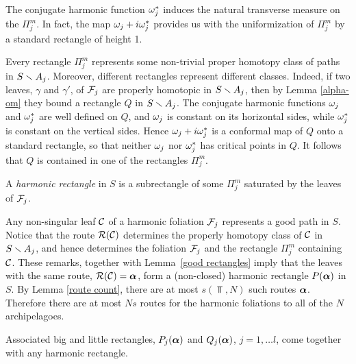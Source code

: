 The conjugate harmonic function ${\omega}_j^*$  induces the natural  transverse measure
 on the  $\Pi_j^m$. 
In fact,   %
the map $ {\omega}_j+ i {\omega}_j^*$
 provides us with the  uniformization of $\Pi^m_j$  by a standard rectangle of height 1.  

Every rectangle $\Pi_j^m$ represents some non-trivial proper homotopy class of paths in $S\smallsetminus A_j$. 
Moreover, different rectangles represent different classes.
Indeed, if two leaves, $\gamma$ and $\gamma'$, of ${\cal F}_j$ are properly homotopic in  $S\smallsetminus A_j$,
then  by Lemma \ref{alpha-om} they bound a rectangle $Q$ in $S\smallsetminus A_j$.
The conjugate  harmonic functions  ${\omega}_j$ and ${\omega}_j^*$ are well defined on $Q$,
and ${\omega}_j$ is constant on its horizontal sides, while ${\omega}_j^*$ is constant on the vertical sides. 
Hence ${\omega}_j + i{\omega}_j^*$ is a conformal map of $Q$ onto a standard rectangle,
so that neither ${\omega}_j$ nor ${\omega}_j^*$ has critical points in $Q$. 
It follows that $Q$ is contained in one of the rectangles $\Pi_j^m$.  
  

 A {\it harmonic rectangle} in $S$ is a subrectangle of some $\Pi_j^m$
saturated by the leaves of ${\cal F}_j$. 



Any non-singular leaf ${\cal C}$ of a harmonic foliation ${\cal F}_j$ represents a good path in $S$.
Notice that the route ${\cal R}({\cal C})$ determines
the properly homotopy class of ${\cal C}$ in $S\smallsetminus A_j$,
and hence determines the foliation ${\cal F}_j$ and  the  rectangle $\Pi_j^m$ containing ${\cal C}$.
These remarks, together with   Lemma~\ref{good rectangles} imply that
 the leaves with the same route,  ${\cal R}({\cal C})= {\mbox{\boldmath$\alpha$} }$, 
form  a (non-closed) harmonic rectangle  $P({\mbox{\boldmath$\alpha$} })$ in $S$.  
By Lemma \ref{route count},
there are at most $s(\Top, N)$ such routes ${\mbox{\boldmath$\alpha$} }$.
Therefore there are at most $Ns$ routes for the harmonic foliations 
 to all of the $N$ archipelagoes. 

 Associated big and little rectangles, $P_j({\mbox{\boldmath$\alpha$} })$ and $Q_j({\mbox{\boldmath$\alpha$} })$, $j=1,\dots l$, 
come together with any harmonic rectangle. 


